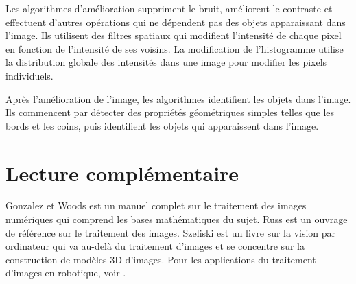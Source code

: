 Les algorithmes d'amélioration suppriment le bruit, améliorent le contraste et effectuent d'autres opérations qui ne dépendent pas des objets apparaissant dans l'image. Ils utilisent des filtres spatiaux qui modifient l'intensité de chaque pixel en fonction de l'intensité de ses voisins. La modification de l'histogramme utilise la distribution globale des intensités dans une image pour modifier les pixels individuels.

Après l'amélioration de l'image, les algorithmes identifient les objets dans l'image. Ils commencent par détecter des propriétés géométriques simples telles que les bords et les coins, puis identifient les objets qui apparaissent dans l'image.

\section{Lecture complémentaire}

Gonzalez et Woods \cite{GW} est un manuel complet sur le traitement des images numériques qui comprend les bases mathématiques du sujet. Russ \cite{russ} est un ouvrage de référence sur le traitement des images. Szeliski \cite{szeliski} est un livre sur la vision par ordinateur qui va au-delà du traitement d'images et se concentre sur la construction de modèles 3D d'images. Pour les applications du traitement d'images en robotique, voir \cite[Chapter~4]{siegwart}.
